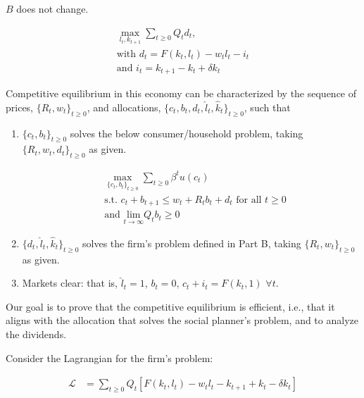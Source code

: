 $B$ does not change.


\begin{align}
    \max_{l_t,k_{t+1}} \sum_{t \geq 0} Q_td_t, \\
    \text{with } d_t = F(k_t, l_t) - w_tl_t - i_t \label{eq:pset_2023_24_ps1_q4_golosov_firm_dividends} \\
    \text{and } i_t = k_{t+1} - k_t + \delta k_t \label{eq:pset_2023_24_ps1_q4_golosov_firm_investment}
\end{align}


Competitive equilibrium in this economy can be 
characterized by the 
sequence of prices, $\{R_t, w_t\}_{t \geq 0}$, 
and allocations, $\{c_t, b_t, d_t, \hat{l}_t, \hat{k}_{t}\}_{t \geq 0}$,
such that

\begin{enumerate}
    \item $\{c_t, b_t\}_{t \geq 0}$ solves the below consumer/household problem,
    taking $\{R_t, w_t, d_t\}_{t \geq 0}$ as given.

\begin{align}
    &\max_{\{c_t, b_t\}_{t \geq 0}} \sum_{t \geq 0} \beta^t u\left(c_t\right) \\
    &\text{s.t. } c_t + b_{t+1} \leq w_t + R_tb_t + d_t \text{ for all } t \geq 0 \\
    &\text{and } \underset{t \rightarrow \infty}{\text{lim}} Q_tb_t \geq 0
\end{align}

    \item $\{d_t, \hat{l}_t, \hat{k}_t\}_{t \geq 0}$ solves the firm's problem defined in Part B, taking $\{R_t, w_t\}_{t \geq 0}$ as given.
    \item Markets clear: that is, $\hat{l}_t = 1$, $b_t = 0$, $c_t + i_t = F(k_t, 1)$ $\forall t$.
\end{enumerate}

Our goal is to prove that the competitive equilibrium is efficient, i.e.,
that it aligns with the allocation that solves the social planner's problem,
and to analyze the dividends.

Consider the Lagrangian for the firm's problem:

\begin{align}
    \mathcal{L} &= \sum_{t \geq 0} Q_t[F(k_t, l_t) - w_tl_t - k_{t+1} + k_t - \delta k_t] \label{eq:pset_2023_24_ps1_q4_golosov_firm_lagrangian}
\end{align}

